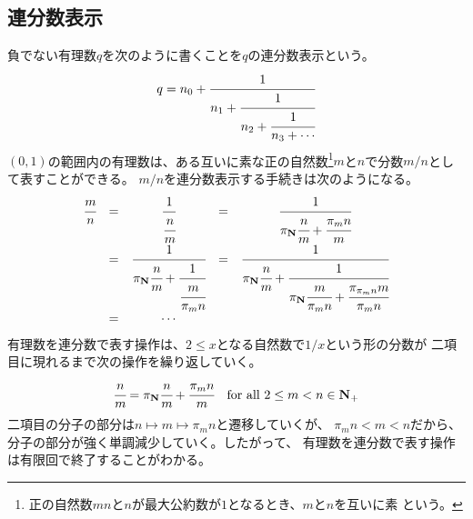 \subsection{連分数表示}\label{s2:連分数表示} %
	負でない有理数$q$を次のように書くことを$q$の連分数表示という。
	\begin{equation*}\begin{split}
		q = n_0 + \cfrac{1}{n_1 + \cfrac{1}{n_2 + \cfrac{1}{n_3 + \cdots}}}
	\end{split}\end{equation*}
	$(0,1)$の範囲内の有理数は、ある互いに素な正の自然数\footnote{
		正の自然数$mn$と$n$が最大公約数が$1$となるとき、$m$と$n$を互いに素
		という。
	}$m$と$n$で分数$m/n$として表すことができる。
	$m/n$を連分数表示する手続きは次のようになる。
	{\setlength\arraycolsep{2pt}
	\begin{equation*}\begin{array}{ccccc}
		\cfrac{m}{n} &=& \cfrac{1}{\cfrac{n}{m}}
		&=& \cfrac{1}{\pi_{\mathbf{N}}\cfrac{n}{m} + \cfrac{\pi_mn}{m}} \\
		&=& \cfrac{1}{\pi_{\mathbf{N}}\cfrac{n}{m} + \cfrac{1}{\cfrac{m}{\pi_mn}}}
		&=& \cfrac{1}{\pi_{\mathbf{N}}\cfrac{n}{m} + \cfrac{1}{\pi_{\mathbf{N}}\cfrac{m}{\pi_mn}+ \cfrac{\pi_{\pi_mn}m}{\pi_mn}}} \\
		&=& \cdots \\
	\end{array}\end{equation*}
	}
	有理数を連分数で表す操作は、$2\le x$となる自然数で$1/x$という形の分数が
	二項目に現れるまで次の操作を繰り返していく。
	\begin{equation*}\begin{split}
		\cfrac{n}{m} = \pi_{\mathbf{N}}\cfrac{n}{m} + \cfrac{\pi_mn}{m}
		\quad\text{for all }2\le m<n\in\mathbf{N}_+
	\end{split}\end{equation*}
	二項目の分子の部分は$n\mapsto m\mapsto \pi_mn$と遷移していくが、
	$\pi_mn<m<n$だから、分子の部分が強く単調減少していく。したがって、
	有理数を連分数で表す操作は有限回で終了することがわかる。

